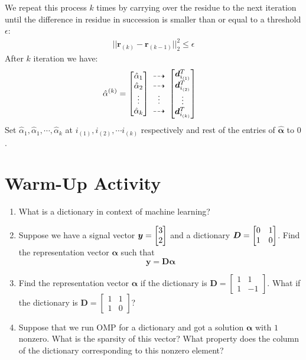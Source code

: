 \documentclass[12pt,letterpaper]{article}
\begin{document}
We repeat this process $k$ times by carrying over the residue to the next iteration until the difference in residue in succession is smaller than or equal to a threshold $\epsilon$: 
\begin{align*}
    ||\bm{r}_{(k)} - \bm{r} _{(k-1)}||^2_2 \leq \epsilon
\end{align*}
After $k$ iteration we have:
\begin{align*}
    \hat{\alpha}^{(k)} &= \mqty[
        \hat{\alpha}_1 \\
        \hat{\alpha}_2 \\
        \vdots \\
        \hat{\alpha}_k
    ]
    \begin{array}{cc}
         \dashrightarrow \\
         \dashrightarrow \\
         \vdots  \\
         \dashrightarrow \\
    \end{array}
    \mqty[
        \bm{d}^T_{i_{(1)}} \\
        \bm{d}^T_{i_{(2)}} \\
        \vdots \\
        \bm{d}^T_{i_{(k)}}
    ]
\end{align*}
Set $\hat{\alpha}_1, \hat{\alpha}_1, \cdots, \hat{\alpha}_k$ at $i_{(1)}, i_{(2)}, \cdots i_{(k)}$ respectively and rest of the entries of $\bm{\hat{\alpha}}$ to $0$.
\pagebreak
\section*{Warm-Up Activity}
\begin{enumerate} [1.]

\item 
  What is a dictionary in context of machine learning?

\item 
  Suppose we have a signal vector $\bm{y}=\mqty[ 3\\ 2]$ and a dictionary $\bm{D}=\mqty[ 0 & 1 \\ 1 & 0 ]$. Find the representation vector $\bm{\alpha}$ such that 
  \[
    \bm{y} = \bm{D}\bm{\alpha} 
  \]

\item 
Find the representation vector $\bm{\alpha}$ if the dictionary is $\bm{D}=\begin{bmatrix} 
1 & 1 \\
1 & -1 
\end{bmatrix}$. What if the dictionary is $\bm{D}=\begin{bmatrix} 
1 & 1 \\
1 & 0 
\end{bmatrix}$?

\item
Suppose that we run OMP for a dictionary and got a solution $\bm{\alpha}$ with $1$ nonzero. What is the sparsity of this vector? What property does the column of the dictionary corresponding to this nonzero element?
\end{enumerate}
\end{document}

